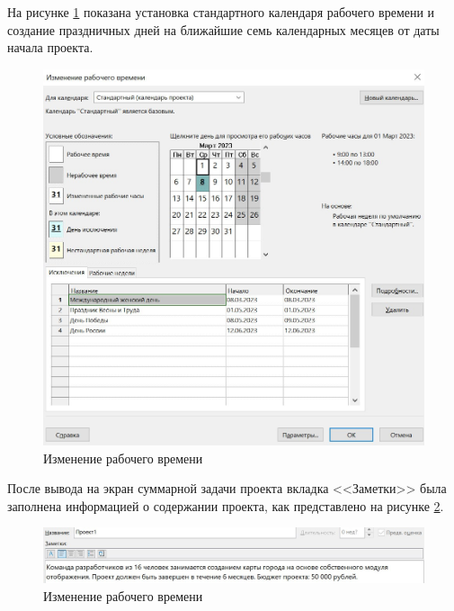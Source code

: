 На рисунке \ref{img:task1-calendar} показана установка стандартного календаря рабочего времени и создание праздничных дней на ближайшие семь календарных месяцев от даты начала проекта.

\begin{figure}[H]
	\begin{center}
		\includegraphics[scale=0.4]{inc/img/task1-calendar.jpg}
	\end{center}
	\captionsetup{justification=centering}
	\caption{Изменение рабочего времени}
	\label{img:task1-calendar}
\end{figure}

После вывода на экран суммарной задачи проекта вкладка <<Заметки>> была заполнена информацией о содержании проекта, как представлено на рисунке \ref{img:task1-description}.

\begin{figure}[H]
	\begin{center}
		\includegraphics[scale=0.4]{inc/img/task1-description.jpg}
	\end{center}
	\captionsetup{justification=centering}
	\caption{Изменение рабочего времени}
	\label{img:task1-description}
\end{figure}

